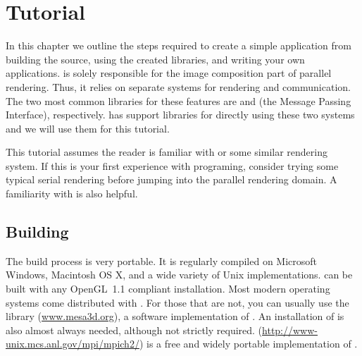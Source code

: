 
\chapter{Tutorial}
\label{chap:Tutorial}

In this chapter we outline the steps required to create a simple \IceT
application from building the \IceT source, using the created libraries,
and writing your own applications.  \IceT is solely responsible for the
image composition part of parallel rendering.  Thus, it relies on separate
systems for rendering and communication.  The two most common libraries
for these features are  and
 (the Message Passing Interface), respectively.
\IceT has support libraries for directly using these two systems and we
will use them for this tutorial.

This tutorial assumes the reader is familiar with \OpenGL or some similar
rendering system.  If this is your first experience with \OpenGL programing,
consider trying some typical serial rendering before jumping into the
parallel rendering domain.  A familiarity with \MPI is also helpful.

\section{Building \IceT}
\label{sec:Tutorial:Building_IceT}

The \IceT build process is very portable.  It is regularly compiled on
Microsoft Windows, Macintosh OS X, and a wide variety of Unix
implementations.  \IceT can be built with any OpenGL~1.1
compliant installation.  Most modern operating systems come distributed
with \OpenGL.  For those that are not, you can usually use the
 library
(\href{www.mesa3d.org}{www.mesa3d.org}), a software implementation of
\OpenGL.  An installation of \MPI is also almost always needed, although not
strictly required.  
(\href{http://www-unix.mcs.anl.gov/mpi/mpich2/}{http://www-unix.mcs.anl.gov/mpi/mpich2/})
is a free and widely portable implementation of \MPI.



